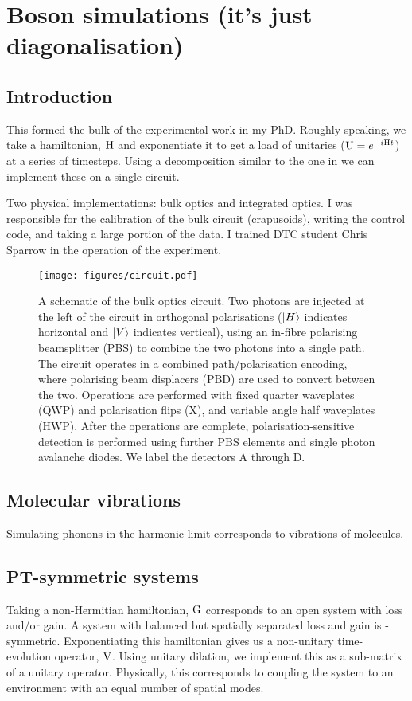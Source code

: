 \chapter{Boson simulations (it's just diagonalisation)}
\label{ch:Simulations}

\section{Introduction}
\label{sec:SimIntro}
This formed the bulk of the experimental work in my PhD. Roughly speaking, we
take a hamiltonian, \(\mathrm{H}\) and exponentiate it to get a load of unitaries
(\(\mathrm{U}=e^{-i\mathrm{H}t}\)) at a series of timesteps. Using a decomposition
similar to the one in \cite{reck94} we can implement these on a single
circuit.

Two physical implementations: bulk optics and integrated optics. I was
responsible for the calibration of the bulk circuit (crapusoids), writing the
control code, and taking a large portion of the data. I trained DTC student
Chris Sparrow in the operation of the experiment.

\begin{figure}
  \centering
  \texttt{[image: figures/circuit.pdf]}
  \caption[A schematic of the bulk optics circuit used for simulations.]
  {A schematic of the bulk optics circuit. Two photons are injected at
  the left of the circuit in orthogonal polarisations (\(\left|H\right\rangle\) indicates
  horizontal and \(\left|V\right\rangle\) indicates vertical), using an in-fibre polarising
  beamsplitter (PBS) to combine the two photons into a single path. The circuit
  operates in a combined path/polarisation encoding, where polarising beam
  displacers (PBD) are used to convert between the two. Operations are performed
  with fixed quarter waveplates (QWP) and polarisation flips (X), and variable
  angle half waveplates (HWP). After the operations are complete,
  polarisation-sensitive detection is performed using further PBS elements and
  single photon avalanche diodes. We label the detectors A through D.}
  \label{fig:circuit}
\end{figure}

\section{Molecular vibrations}
\label{sec:Molecules}
Simulating phonons in the harmonic limit corresponds to vibrations of molecules.

\section{PT-symmetric systems}
\label{sec:PT}
Taking a non-Hermitian hamiltonian, \(\mathrm{G}\) corresponds to an open system
with loss and/or gain. A system with balanced but spatially separated loss and
gain is \pt-symmetric. Exponentiating this hamiltonian gives us a non-unitary
time-evolution operator, \(\mathrm{V}\). Using unitary dilation, we implement this
as a sub-matrix of a unitary operator. Physically, this corresponds to coupling
the system to an environment with an equal number of spatial modes.

